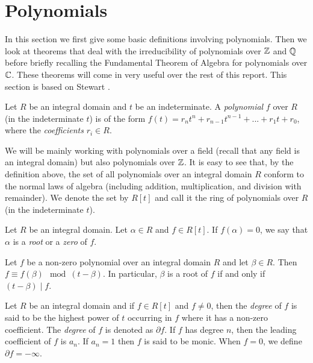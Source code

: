 

\section{Polynomials} \label{sec:poly}
In this section we first give some basic definitions involving polynomials. Then we look at theorems that deal with the irreducibility of polynomials over $\mathbb Z$ and $\mathbb Q$ before briefly recalling the Fundamental Theorem of Algebra for polynomials over $\mathbb C$. These theorems will come in very useful over the rest of this report. This section is based on Stewart \cite[Chapters~2-3]{Stewart}. 

\begin{definition}
    Let $R$ be an integral domain and $t$ be an indeterminate. A \textit{polynomial} $f$ over $R$ (in the indeterminate $t$) is of the form $f(t) = r_n t^n + r_{n-1} t^{n-1} + ... + r_1 t + r_0$, where the \textit{coefficients} $r_i \in R$. 
\end{definition}

We will be mainly working with polynomials over a field (recall that any field is an integral domain) but also polynomials over $\mathbb Z$. It is easy to see that, by the definition above, the set of all polynomials over an integral domain $R$ conform to  the normal laws of algebra (including addition, multiplication, and division with remainder). We denote the set by $R[t]$ and call it the ring of polynomials over $R$ (in the indeterminate $t$). 

\begin{definition}
	Let $R$ be an integral domain. Let $\alpha \in R$ and $f \in R[t]$. If $f(\alpha) = 0$, we say that $\alpha$ is a \textit{root} or a \textit{zero} of $f$. 
\end{definition}

\begin{theorem} \label{thm:remainder}
	Let $f$ be a non-zero polynomial over an integral domain $R$ and let $\beta \in R$. Then $f \equiv f(\beta) \mod (t - \beta)$. 
	In particular, $\beta$ is a root of $f$ if and only if $(t - \beta) \mid f$. 
\end{theorem}


\begin{definition}
    Let $R$ be an integral domain and if $f \in R[t]$ and $f \neq 0$, then the \textit{degree} of $f$ is said to be the highest power of $t$ occurring in $f$ where it has a non-zero coefficient. The \textit{degree} of $f$ is denoted as $\partial f$. If $f$ has degree $n$, then the leading coefficient of $f$ is $a_n$. If $a_n = 1$ then $f$ is said to be monic. When $f = 0$, we define $\partial f = - \infty$.
\end{definition}


